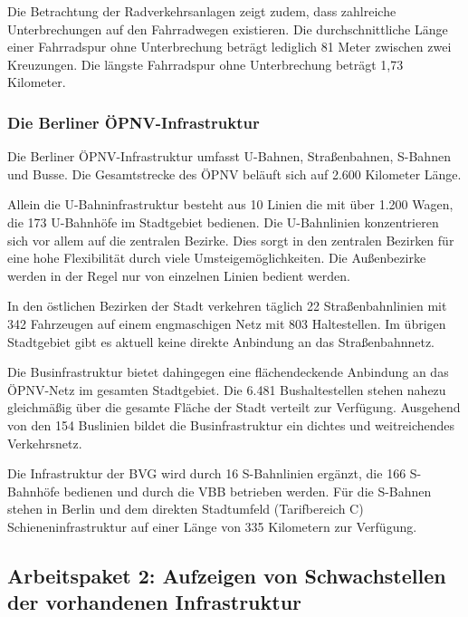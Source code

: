 
Die Betrachtung der Radverkehrsanlagen zeigt zudem, dass zahlreiche Unterbrechungen auf den Fahrradwegen existieren. Die durchschnittliche Länge einer Fahrradspur ohne Unterbrechung beträgt lediglich 81 Meter zwischen zwei Kreuzungen. Die längste Fahrradspur ohne Unterbrechung beträgt 1,73 Kilometer.

\subsubsection{Die Berliner ÖPNV-Infrastruktur}

Die Berliner ÖPNV-Infrastruktur umfasst U-Bahnen, Straßenbahnen, S-Bahnen und Busse. Die Gesamtstrecke des ÖPNV beläuft sich auf 2.600 Kilometer Länge.


Allein die U-Bahninfrastruktur besteht aus 10 Linien die mit über 1.200 Wagen, die 173 U-Bahnhöfe im Stadtgebiet bedienen. Die U-Bahnlinien konzentrieren sich vor allem auf die zentralen Bezirke. Dies sorgt in den zentralen Bezirken für eine hohe Flexibilität durch viele Umsteigemöglichkeiten. Die Außenbezirke werden in der Regel nur von einzelnen Linien bedient werden.

In den östlichen Bezirken der Stadt verkehren täglich 22 Straßenbahnlinien mit 342 Fahrzeugen auf einem engmaschigen Netz mit 803 Haltestellen. Im übrigen Stadtgebiet gibt es aktuell keine direkte Anbindung an das Straßenbahnnetz.

Die Businfrastruktur bietet dahingegen eine flächendeckende Anbindung an das ÖPNV-Netz im gesamten Stadtgebiet. Die 6.481 Bushaltestellen stehen nahezu gleichmäßig über die gesamte Fläche der Stadt verteilt zur Verfügung. Ausgehend von den 154 Buslinien bildet die Businfrastruktur ein dichtes und weitreichendes Verkehrsnetz.

Die Infrastruktur der BVG wird durch 16 S-Bahnlinien ergänzt, die 166 S-Bahnhöfe bedienen und durch die VBB betrieben werden. Für die S-Bahnen stehen in Berlin und dem direkten Stadtumfeld (Tarifbereich C) Schieneninfrastruktur auf einer Länge von 335 Kilometern zur Verfügung.


\subsection{Arbeitspaket 2: Aufzeigen von Schwachstellen der vorhandenen Infrastruktur}

